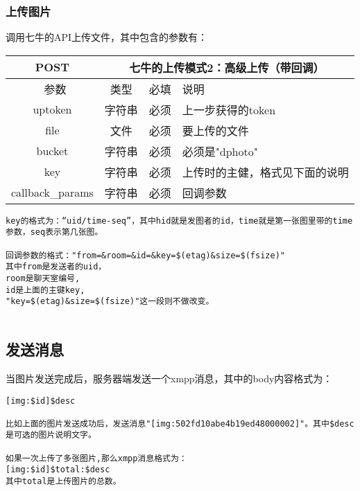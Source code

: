 \subsubsection{上传图片}

调用七牛的API上传文件，其中包含的参数有：

\begin{table}[H]
   \begin{center}
\begin{tabular}{|c|c|c|p{12cm}|}
\hline
POST & \multicolumn{3}{|c|}{七牛的上传模式2：高级上传（带回调）} \\
\hline\hline
 \  参数  & 类型 & 必填 &  说明  \\
\hline
 uptoken  & 字符串 & 必须 &  上一步获得的token\\
 \hline
 file  & 文件 & 必须 &  要上传的文件\\
 \hline
 bucket  & 字符串 & 必须 & 必须是"dphoto"\\
 \hline
 key  & 字符串 & 必须 &  上传时的主健，格式见下面的说明\\
  \hline
 callback\_params  & 字符串 & 必须 &  回调参数\\
 \hline    
\end{tabular}
   \end{center}
\end{table}

\begin{verbatim}
key的格式为：“uid/time-seq”，其中hid就是发图者的id，time就是第一张图里带的time参数，seq表示第几张图。

回调参数的格式："from=&room=&id=&key=$(etag)&size=$(fsize)"
其中from是发送者的uid，
room是聊天室编号,
id是上面的主键key,
"key=$(etag)&size=$(fsize)"这一段则不做改变。


\end{verbatim}


\subsection{发送消息}
当图片发送完成后，服务器端发送一个xmpp消息，其中的body内容格式为：

\begin{verbatim}
[img:$id]$desc

比如上面的图片发送成功后，发送消息"[img:502fd10abe4b19ed48000002]"。其中$desc是可选的图片说明文字。

如果一次上传了多张图片,那么xmpp消息格式为：
[img:$id]$total:$desc
其中total是上传图片的总数。
\end{verbatim}

